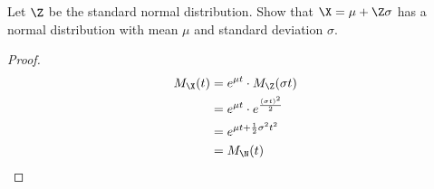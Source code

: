 \documentclass{article}
\begin{document}
Let $\Z$ be the standard normal distribution. Show that $\X = \mu + \Z\sigma$ has a normal
distribution with mean $\mu$ and standard deviation $\sigma$.

\begin{proof}
\begin{align*}
M_{\X}(t) & = e^{\mu t} \cdot M_{\Z}(\sigma t) \\
& = e^{\mu t} \cdot e^{\frac{(\sigma t)^2}{2}} \\
& = e^{\mu t + \frac{1}{2}\sigma^2t^2} \\
& = M_{\N}(t)
\end{align*}
\end{proof}
\end{document}
